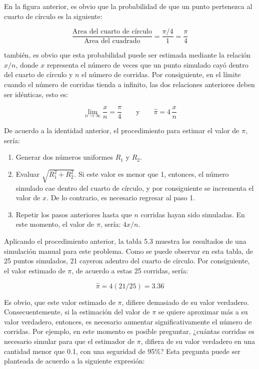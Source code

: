 \documentclass[11pt,letterpaper]{report}
\begin{document}
En la figura anterior, es obvio que la probabilidad de que un punto
pertenezca al cuarto de círculo es la siguiente:

\[
\frac{\text{Area del cuarto de círculo}}{\text{Area del cuadrado}}=\frac{\pi/4}{1}=\frac{\pi}{4}
\]

también, es obvio que esta probabilidad puede ser estimada mediante la
relación $x/n$, donde $x$ representa el número de veces que un punto
simulado cayó dentro del cuarto de círculo y $n$ el número de corridas. Por
consiguiente, en el límite cuando el número de corridas tienda a infinito,
las dos relaciones anteriores deben ser idénticas, esto es:

\[
\lim_{n\to\infty}\frac{x}{n}=\frac{\pi}{4}\qquad\text{y}\qquad \hat{\pi}=4\,\frac{x}{n}
\]

De acuerdo a la identidad anterior, el procedimiento para estimar el valor
de $\pi$, sería:

\begin{enumerate}[label=\arabic*.]
\item Generar dos números uniformes $R_1$ y $R_2$.
\item Evaluar $\sqrt{R_1^{2}+R_2^{2}}$. Si este valor es menor que 1,
entonces, el número simulado cae dentro del cuarto de círculo, y por
consiguiente se incrementa el valor de $x$. De lo contrario, es necesario
regresar al paso 1.
\item Repetir los pasos anteriores hasta que $n$ corridas hayan sido
simuladas. En este momento, el valor de $\pi$, sería: $4x/n$.
\end{enumerate}

Aplicando el procedimiento anterior, la tabla 5.3 muestra los resultados de
una simulación manual para este problema. Como se puede observar en esta
tabla, de 25 puntos simulados, 21 cayeron adentro del cuarto de círculo.
Por consiguiente, el valor estimado de $\pi$, de acuerdo a estas 25
corridas, sería:

\[
\hat{\pi}=4(21/25)=3.36
\]

Es obvio, que este valor estimado de $\pi$, difiere demasiado de su valor
verdadero. Consecuentemente, si la estimación del valor de $\pi$ se quiere
aproximar más a su valor verdadero, entonces, es necesario aumentar
significativamente el número de corridas. Por ejemplo, en este momento es
posible preguntar, ¿cuántas corridas es necesario simular para que el
estimador de $\pi$, difiera de su valor verdadero en una cantidad menor que
0.1, con una seguridad de 95\%? Esta pregunta puede ser planteada de
acuerdo a la siguiente expresión:
\end{document}
